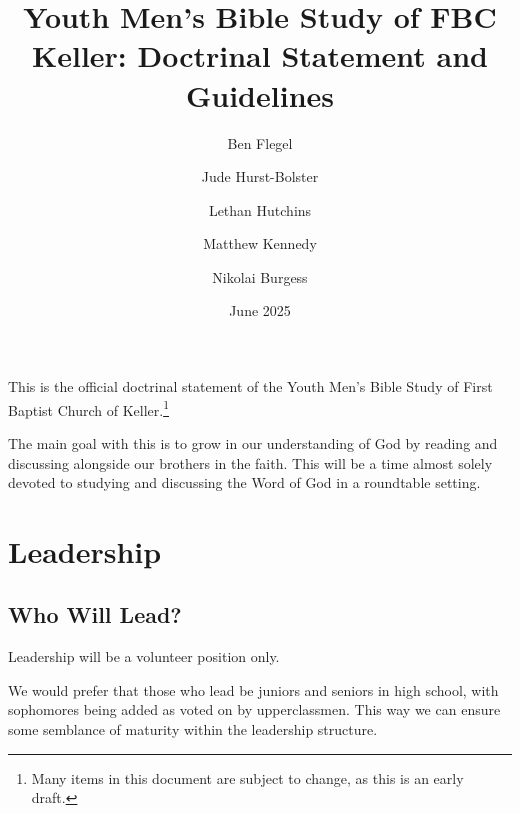 \documentclass[12pt]{article}
\title{Youth Men's Bible Study of FBC Keller: Doctrinal Statement and Guidelines}
\author{Ben Flegel \and Jude Hurst-Bolster \and Lethan Hutchins \and Matthew Kennedy \and Nikolai Burgess }
\date{June 2025}
\begin{document}
\maketitle{}

  This is the official doctrinal statement of the Youth Men's Bible Study of
First Baptist Church of Keller.\footnote{Many items in this document are subject
to change, as this is an early draft.}

  The main goal with this is to grow in our understanding of God by reading and
discussing alongside our brothers in the faith. This will be a time almost
solely devoted to studying and discussing the Word of God in a roundtable
setting.

%
%
%
%
%
%

\section{Leadership}

\subsection{Who Will Lead?}

  Leadership will be a volunteer position only.

  We would prefer that those who lead be juniors and seniors in high school,
with sophomores being added as voted on by upperclassmen. This way we can ensure
some semblance of maturity within the leadership structure.
\end{document}
